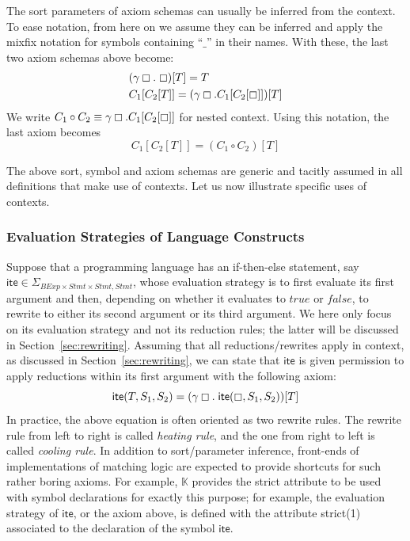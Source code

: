 \documentclass[UTF8,11pt]{article}
\theoremstyle{plain}
\theoremstyle{definition}
\theoremstyle{remark}
\newcommand{\K}{\mbox{$\mathbb{K}$}\xspace}
\newcommand{\hole}{\boxempty}
\newcommand{\BExp}{\textit{BExp}}
\newcommand{\Stmt}{\textit{Stmt}}
\newcommand{\ite}{\textsf{ite}}
\newcommand{\ttrue}{\textit{true}}
\newcommand{\ffalse}{\textit{false}}
\newcommand{\compose}{\circ}
\begin{document}
The sort parameters of axiom schemas can usually be inferred from the context.
To ease notation, from here on we assume they can be inferred and apply the
mixfix notation for symbols containing ``$\_$'' in their names.
With these, the last two axiom schemas above become:
\begin{align*}
& (\gamma \hole .\; \hole)[T] = T \\
& C_1[C_2[T]] = (\gamma \hole . C_1[C_2[\hole]])[T]
\end{align*}
We write 
$C_1 \compose C_2 \equiv \gamma \hole . C_1[C_2[\hole]]$
for nested context.
Using this notation, the last axiom becomes
$$
C_1[C_2[T]] = (C_1 \compose C_2) [T]
$$

The above sort, symbol and axiom schemas are generic and tacitly assumed in
all definitions that make use of contexts.
Let us now illustrate specific uses of contexts.

\subsubsection{Evaluation Strategies of Language Constructs}
\label{sec:evaluationstrategies}
Suppose that a programming language has an if-then-else statement,
say $\ite\in\Sigma_{\BExp\times\Stmt\times\Stmt,\Stmt}$,
whose evaluation strategy is to first evaluate its first argument and then, depending
on whether it evaluates to $\ttrue$ or $\ffalse$, to rewrite to either
its second argument or its third argument.
We here only focus on its evaluation strategy and not its reduction rules;
the latter will be discussed in Section~\ref{sec:rewriting}.
Assuming that all reductions/rewrites apply in context, as discussed in
Section~\ref{sec:rewriting}, we can state that $\ite$ is given permission to
apply reductions within its first argument with the following axiom:
$$
\ite(T,S_1,S_2) = (\gamma\hole.\;\ite(\hole,S_1,S_2))[T]
$$
In practice, the above equation is often oriented as two rewrite rules.
The rewrite rule from left to right is called \emph{heating rule},
and the one from right to left is called \emph{cooling rule}.
In addition to sort/parameter inference, front-ends of implementations of
matching logic are expected to provide shortcuts for such rather boring
axioms.
For example, \K provides the \textsf{strict} attribute to be used with symbol
declarations for exactly this purpose; for example, the evaluation strategy
of $\ite$, or the axiom above, is defined with the attribute
\textsf{strict(1)} associated to the declaration of the symbol $\ite$.
\end{document}
